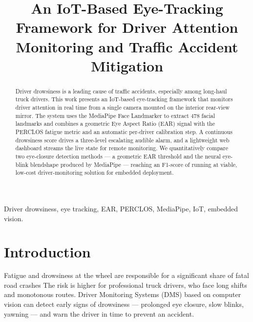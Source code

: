 \documentclass[conference]{IEEEtran}
\begin{document}
\title{An IoT-Based Eye-Tracking Framework for Driver Attention Monitoring and
Traffic Accident Mitigation}

\author{
}

\maketitle

\begin{abstract}
Driver drowsiness is a leading cause of traffic accidents, especially among
long-haul truck drivers. This work presents an IoT-based eye-tracking framework
that monitors driver attention in real time from a single camera mounted on the
interior rear-view mirror. The system uses the MediaPipe Face Landmarker to
extract 478 facial landmarks and combines a geometric Eye Aspect Ratio (EAR)
signal with the PERCLOS fatigue metric and an automatic per-driver calibration
step. A continuous drowsiness score drives a three-level escalating audible
alarm, and a lightweight web dashboard streams the live state for remote
monitoring. We quantitatively compare two eye-closure detection methods --- a
geometric EAR threshold and the neural eye-blink blendshape produced by
MediaPipe --- reaching an F1-score of %
running at %
viable, low-cost driver-monitoring solution for embedded deployment.
\end{abstract}

\begin{IEEEkeywords}
Driver drowsiness, eye tracking, EAR, PERCLOS, MediaPipe, IoT, embedded vision.
\end{IEEEkeywords}

\section{Introduction}
Fatigue and drowsiness at the wheel are responsible for a significant share of
fatal road crashes %
The risk is higher for professional truck drivers, who face long shifts and
monotonous routes. Driver Monitoring Systems (DMS) based on computer vision can
detect early signs of drowsiness --- prolonged eye closure, slow blinks,
yawning --- and warn the driver in time to prevent an accident.
\end{document}
